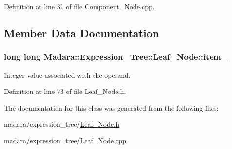 Definition at line 31 of file Component\_\-Node.cpp.



\subsection{Member Data Documentation}
\hypertarget{classMadara_1_1Expression__Tree_1_1Leaf__Node_a5623e989280b33eca0c9ca29d490aae3}{
\subsubsection[{item\_\-}]{\setlength{\rightskip}{0pt plus 5cm}long long {\bf Madara::Expression\_\-Tree::Leaf\_\-Node::item\_\-}}}
\label{de/de4/classMadara_1_1Expression__Tree_1_1Leaf__Node_a5623e989280b33eca0c9ca29d490aae3}


Integer value associated with the operand. 



Definition at line 73 of file Leaf\_\-Node.h.



The documentation for this class was generated from the following files:\begin{DoxyCompactItemize}
\item 
madara/expression\_\-tree/\hyperlink{Leaf__Node_8h}{Leaf\_\-Node.h}\item 
madara/expression\_\-tree/\hyperlink{Leaf__Node_8cpp}{Leaf\_\-Node.cpp}\end{DoxyCompactItemize}
